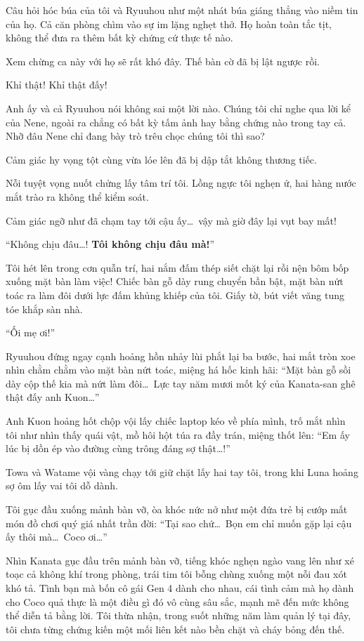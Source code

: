 \documentclass[../main.tex]{subfiles}
\begin{document}
Câu hỏi hóc búa của tôi và Ryuuhou như một nhát búa giáng thẳng vào niềm tin của họ. Cả căn phòng chìm vào sự im lặng nghẹt thở. Họ hoàn toàn tắc tịt, không thể đưa ra thêm bất kỳ chứng cứ thực tế nào.

Xem chừng ca này với họ sẽ rất khó đây. Thế bàn cờ đã bị lật ngược rồi.


Khỉ thật! Khỉ thật đấy!

Anh ấy và cả Ryuuhou nói không sai một lời nào. Chúng tôi chỉ nghe qua lời kể của Nene, ngoài ra chẳng có bất kỳ tấm ảnh hay bằng chứng nào trong tay cả. Nhỡ đâu Nene chỉ đang bày trò trêu chọc chúng tôi thì sao?

Cảm giác hy vọng tột cùng vừa lóe lên đã bị dập tắt không thương tiếc.

Nỗi tuyệt vọng nuốt chửng lấy tâm trí tôi. Lồng ngực tôi nghẹn ứ, hai hàng nước mắt trào ra không thể kiểm soát.

Cảm giác ngỡ như đã chạm tay tới cậu ấy\dots\ vậy mà giờ đây lại vụt bay mất!

``Không chịu đâu\dots! \textbf{Tôi không chịu đâu mà!}''

Tôi hét lên trong cơn quẫn trí, hai nắm đấm thép siết chặt lại rồi nện bôm bốp xuống mặt bàn làm việc! Chiếc bàn gỗ dày rung chuyển bần bật, mặt bàn nứt toác ra làm đôi dưới lực đấm khủng khiếp của tôi. Giấy tờ, bút viết văng tung tóe khắp sàn nhà.

``Ối mẹ ơi!''

Ryuuhou đứng ngay cạnh hoảng hồn nhảy lùi phắt lại ba bước, hai mắt tròn xoe nhìn chằm chằm vào mặt bàn nứt toác, miệng há hốc kinh hãi: ``Mặt bàn gỗ sồi dày cộp thế kia mà nứt làm đôi\dots\ Lực tay năm mươi mốt ký của Kanata-san ghê thật đấy anh Kuon\dots''

Anh Kuon hoảng hốt chộp vội lấy chiếc laptop kéo về phía mình, trố mắt nhìn tôi như nhìn thấy quái vật, mồ hôi hột túa ra đầy trán, miệng thốt lên: ``Em ấy lúc bị dồn ép vào đường cùng trông đáng sợ thật\dots!''

Towa và Watame vội vàng chạy tới giữ chặt lấy hai tay tôi, trong khi Luna hoảng sợ ôm lấy vai tôi dỗ dành.

Tôi gục đầu xuống mảnh bàn vỡ, òa khóc nức nở như một đứa trẻ bị cướp mất món đồ chơi quý giá nhất trần đời: ``Tại sao chứ\dots\ Bọn em chỉ muốn gặp lại cậu ấy thôi mà\dots\ Coco ơi\dots''


Nhìn Kanata gục đầu trên mảnh bàn vỡ, tiếng khóc nghẹn ngào vang lên như xé toạc cả không khí trong phòng, trái tim tôi bỗng chùng xuống một nỗi đau xót khó tả. Tình bạn mà bốn cô gái Gen 4 dành cho nhau, cái tình cảm mà họ dành cho Coco quả thực là một điều gì đó vô cùng sâu sắc, mạnh mẽ đến mức không thể diễn tả bằng lời. Tôi thừa nhận, trong suốt những năm làm quản lý tại đây, tôi chưa từng chứng kiến một mối liên kết nào bền chặt và cháy bỏng đến thế.
\end{document}
